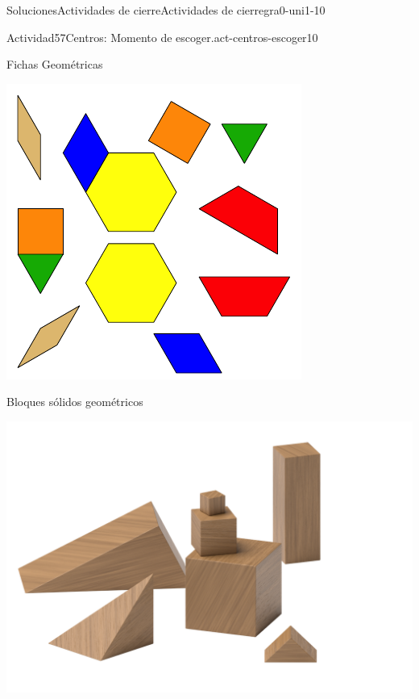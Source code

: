 \documentclass[twoside,10pt,]{article}
\begin{document}
\begin{solutions-section}{Soluciones}{Actividades de cierre}{}{Actividades de cierre}{}{}{gra0-uni1-10}
\begin{activitysolution}{Actividad}{57}{Centros: Momento de escoger.}{act-centros-escoger10}
\begin{sidebyside}{2}{0.025}{0.025}{0.05}
\begin{sbspanel}{0.45}
\end{sbspanel}%
\begin{sbspanel}{0.45}%
Fichas Geométricas%
\par
\includegraphics[width=\linewidth]{external/svg-source/tikz-file-147344.pdf}
\end{sbspanel}%
\end{sidebyside}%
\begin{sidebyside}{2}{0.025}{0.025}{0.05}%
\begin{sbspanel}{0.45}%
Bloques sólidos geométricos%
\par
\includegraphics[width=\linewidth]{external/png-source/K.1.A Beta Student Workbook.Geoblocks.png}

\end{sbspanel}
\end{sidebyside}
\end{activitysolution}
\end{solutions-section}
\end{document}
